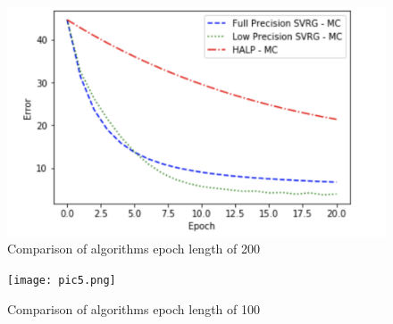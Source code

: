 \documentclass{article}
\begin{document}
\begin{figure}[ht!]
    \centering
    \includegraphics[width=.5\textwidth]{pic4.png}
    \caption{Comparison of algorithms epoch length of 200}
\end{figure}

\begin{figure}[ht!]
    \centering
    \texttt{[image: pic5.png]}
    \caption{Comparison of algorithms epoch length of 100}
\end{figure}

\printbibliography
\end{document}
